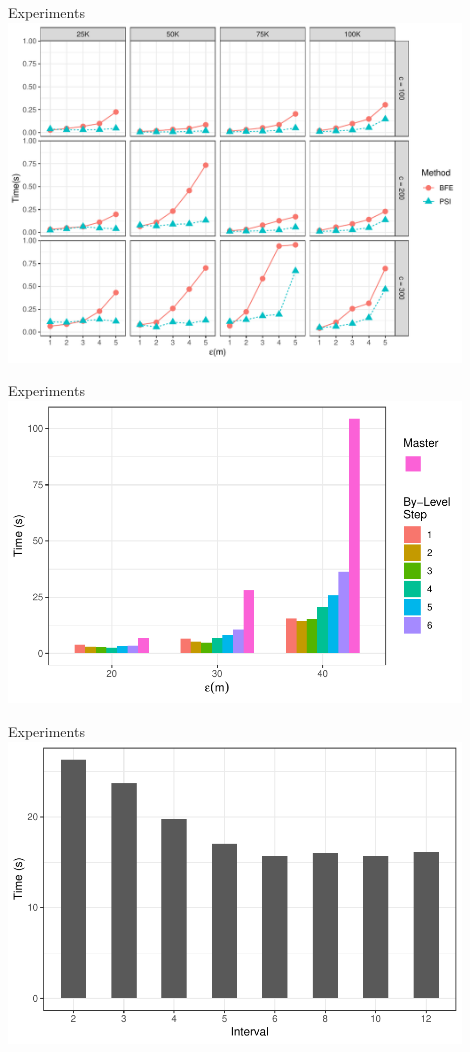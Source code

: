 \documentclass{beamer}
\begin{document}
    \begin{frame}{Experiments}
        \centering
        \includegraphics[width=0.9\textwidth]
                {../thesis/chapter4/figures/plots/05_uniform_performance/uniform_performance}
    \end{frame}

    \begin{frame}{Experiments}
        \centering
        \includegraphics[width=0.9\textwidth]
                {../thesis/chapter4/figures/plots/06_step_performance/step_performance}
    \end{frame}

    \begin{frame}{Experiments}
        \centering
        \includegraphics[width=0.9\textwidth]
                {../thesis/chapter4/figures/plots/07_interval_performance/interval-performance}
    \end{frame}
\end{document}
